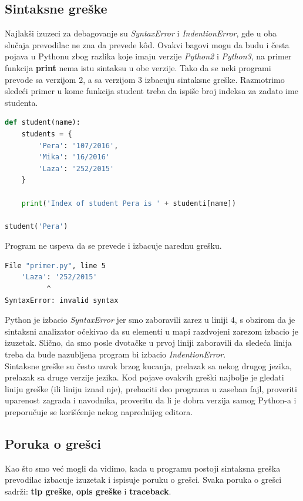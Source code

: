 \documentclass[a4paper]{article}
\begin{document}
\subsection{Sintaksne greške}
Najlakši izuzeci za debagovanje su \emph{SyntaxError} i \emph{IndentionError}, gde u oba slučaja prevodilac ne zna da prevede k\^{o}d. Ovakvi bagovi mogu da budu i česta pojava u Pythonu zbog razlika koje imaju verzije \emph{Python2} i \emph{Python3}, na primer funkcija \textbf{print} nema istu sintaksu u obe verzije. Tako da se neki programi prevode sa verzijom 2, a sa verzijom 3 izbacuju sintaksne greške. Razmotrimo sledeći primer u kome funkcija student treba da ispiše broj indeksa za zadato ime studenta.
\begin{lstlisting}[language = Python, caption={Funkcija student ispisuje broj indeksa za zadato ime studenta}]
def student(name):
    students = {
        'Pera': '107/2016',
        'Mika': '16/2016'
        'Laza': '252/2015'
    }

    print('Index of student Pera is ' + studenti[name])

student('Pera')
\end{lstlisting}
Program ne uspeva da se prevede i izbacuje narednu grešku.
\begin{lstlisting}[language = bash, caption={Ispis iz konzole za prethodni primer}]
  File "primer.py", line 5
    'Laza': '252/2015'
          ^
SyntaxError: invalid syntax
\end{lstlisting}
Python je izbacio \emph{SyntaxError} jer smo zaboravili zarez u liniji 4, s obzirom da je sintaksni analizator očekivao da su elementi u mapi razdvojeni zarezom izbacio je izuzetak. Slično, da smo posle dvotačke u prvoj liniji zaboravili da sledeća linija treba da bude nazubljena program bi izbacio \emph{IndentionError}.\\
Sintaksne greške su često uzrok brzog kucanja, prelazak sa nekog drugog jezika, prelazak sa druge verzije jezika. Kod pojave ovakvih greški najbolje je gledati liniju greške (ili liniju iznad nje), prebaciti deo programa u zaseban fajl, proveriti uparenost zagrada i navodnika, proveritu da li je dobra verzija samog Python-a i preporučuje se korišćenje nekog naprednijeg editora.
\subsection{Poruka o grešci}
Kao što smo već mogli da vidimo, kada u programu postoji sintaksna greška prevodilac izbacuje izuzetak i ispisuje poruku o grešci. Svaka poruka o grešci sadrži: \textbf{tip greške}, \textbf{opis greške} i \textbf{traceback}.
\end{document}
